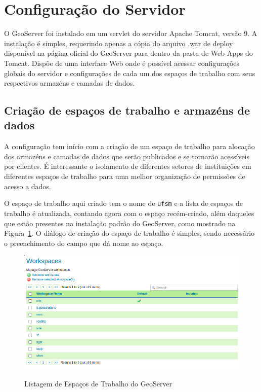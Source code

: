 \documentclass[oneside,openright,12pt]{ufsm_2015} %
\begin{document}
\section{Configuração do Servidor}

O GeoServer foi instalado em um servlet do servidor Apache Tomcat, versão 9. A instalação é simples, requerindo apenas a cópia do arquivo .war de deploy disponível na página oficial do GeoServer para dentro da pasta de Web Apps do Tomcat. 
Dispõe de uma interface Web onde é possível acessar configurações globais do servidor e configurações de cada um dos espaços de trabalho com seus respectivos armazéns e camadas de dados.

\subsection{Criação de espaços de trabalho e armazéns de dados}

A configuração tem início com a criação de um espaço de trabalho para alocação dos armazéns e camadas de dados que serão publicados e se tornarão acessíveis por clientes. 
É interessante o isolamento de diferentes setores de instituições em diferentes espaços de trabalho para uma melhor organização de permissões de acesso a dados.

O espaço de trabalho aqui criado tem o nome de {\tt ufsm} e a lista de espaços de trabalho é atualizada, contando agora com o espaço recém-criado, além daqueles que estão presentes na instalação padrão do GeoServer, como mostrado na Figura~\ref{fig:workspace}.
O diálogo de criação do espaço de trabalho é simples, sendo necessário o preenchimento do campo que dá nome ao espaço.

\begin{figure}[h!]
\caption{Listagem de Espaços de Trabalho do GeoServer}
    \centering
    \includegraphics[scale=0.4]{imagens/workspaces_Geoserver.png}
    \label{fig:workspace}
\end{figure}
\end{document}
